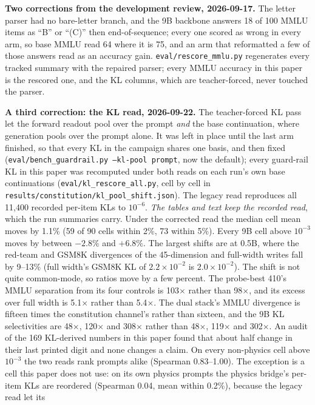 \documentclass[11pt]{article}
\newcommand{\code}[1]{\texttt{#1}}
\begin{document}
\textbf{Two corrections from the development review, 2026-09-17.} The letter parser
had no bare-letter branch, and the 9B backbone answers 18 of 100 MMLU items as ``B''
or ``(C)'' then end-of-sequence; every one scored as wrong in every arm, so base MMLU
read 64 where it is 75, and an arm that reformatted a few of those answers read as an
accuracy gain. \code{eval/rescore\_mmlu.py} regenerates every tracked summary with the
repaired parser; every MMLU accuracy in this paper is the rescored one, and the KL
columns, which are teacher-forced, never touched the parser.

\textbf{A third correction: the KL read, 2026-09-22.} The teacher-forced KL pass let
the forward readout pool over the prompt \emph{and} the base continuation, where
generation pools over the prompt alone. It was left in place until the last arm
finished, so that every KL in the campaign shares one basis, and then fixed
(\code{eval/bench\_guardrail.py --kl-pool prompt}, now the default); every
guard-rail KL in this paper was recomputed under both reads on each run's own base
continuations (\code{eval/\allowbreak{}kl\_rescore\_all.py}, cell by cell in
\code{results/\allowbreak{}constitution/\allowbreak{}kl\_pool\_shift.json}). The
legacy read reproduces all 11,400 recorded per-item KLs to $10^{-6}$. \emph{The tables
and text keep the recorded read}, which the run summaries carry. Under the corrected
read the median cell mean moves by 1.1\% (59 of 90 cells within 2\%, 73 within
5\%). Every 9B cell above $10^{-3}$ moves by between $-2.8\%$ and $+6.8\%$. The
largest shifts are at 0.5B, where the red-team and GSM8K divergences of the 45-dimension
and full-width writes fall by 9--13\% (full width's GSM8K KL of $2.2\times10^{-2}$
is $2.0\times10^{-2}$). The shift is not quite common-mode, so ratios move by a few
percent. The probe-best 410's MMLU separation from its four controls is 103$\times$
rather than 98$\times$, and its excess over full width is 5.1$\times$ rather than
5.4$\times$. The dual stack's MMLU divergence is fifteen times the constitution
channel's rather than sixteen, and the 9B KL selectivities are 48$\times$,
120$\times$ and 308$\times$ rather than 48$\times$, 119$\times$ and 302$\times$. An
audit of the 169 KL-derived numbers in this paper found that about half change in
their last printed digit and none changes a claim. On every non-physics cell above
$10^{-3}$ the two reads rank prompts alike (Spearman 0.83--1.00). The exception is a
cell this paper does not use: on its own physics prompts the physics bridge's per-item
KLs are reordered (Spearman 0.04, mean within 0.2\%), because the legacy read let its
\end{document}

